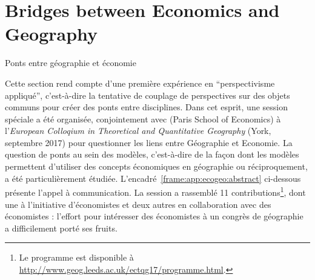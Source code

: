 



\newpage

\section{Bridges between Economics and Geography}{Ponts entre géographie et économie}


\label{app:sec:ecogeo}


Cette section rend compte d'une première expérience en ``perspectivisme appliqué'', c'est-à-dire la tentative de couplage de perspectives sur des objets communs pour créer des ponts entre disciplines. Dans cet esprit, une session spéciale a été organisée, conjointement avec  (Paris School of Economics) à l'\emph{European Colloqium in Theoretical and Quantitative Geography} (York, septembre 2017) pour questionner les liens entre Géographie et Economie. La question de ponts au sein des modèles, c'est-à-dire de la façon dont les modèles permettent d'utiliser des concepts économiques en géographie ou réciproquement, a été particulièrement étudiée. L'encadré~\ref{frame:app:ecogeo:abstract} ci-dessous présente l'appel à communication. La session a rassemblé 11 contributions\footnote{Le programme est disponible à \url{http://www.geog.leeds.ac.uk/ectqg17/programme.html}.}, dont une à l'initiative d'économistes et deux autres en collaboration avec des économistes : l'effort pour intéresser des économistes à un congrès de géographie a difficilement porté ses fruits.


